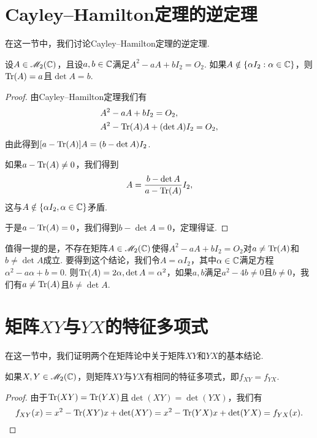 \section{Cayley--Hamilton定理的逆定理}

在这一节中，我们讨论Cayley--Hamilton定理的{\kaishu 逆定理}.
\begin{mybox}
  \begin{theorem}

    设$A\in\mathscr M_2(\mathbb C)$，且设$a,b\in\mathbb C$满足$A^2-aA+bI_2=O_2$. 如果$A\notin\{\alpha I_2:\alpha\in\mathbb C\}$，则$\operatorname{Tr}(A)=a$且$\det A=b$.
  \end{theorem}
\end{mybox}

\begin{proof}
  由Cayley--Hamilton定理我们有
  \begin{align*}
    & A^2 - aA + bI_2 = O_2, \\
    & A^2 - \operatorname{Tr}(A)A + (\det A)I_2 = O_2,
  \end{align*}
  由此得到$[a-\operatorname{Tr}(A)]A=(b-\det A)I_2$.

  如果$a-\operatorname{Tr}(A)\ne0$，我们得到
  \[
    A = \frac{b - \det A}{a - \operatorname{Tr}(A)}I_2,
  \]
  这与$A\notin\{\alpha I_2,\alpha\in\mathbb C\}$矛盾.

  于是$a-\operatorname{Tr}(A)=0$，我们得到$b-\det A = 0$，定理得证.
\end{proof}

\begin{remark}
  值得一提的是，不存在矩阵$A\in\mathscr M_2(\mathbb C)$使得$A^2-aA+bI_2=O_2$对$a\ne\operatorname{Tr}(A)$和$b\ne\det A$成立. 要得到这个结论，我们令$A=\alpha I_2$，其中$\alpha\in\mathbb C$满足方程$\alpha^2-a\alpha+b=0$. 则$\operatorname{Tr}(A)=2\alpha,\det A=\alpha^2$，如果$a,b$满足$a^2-4b\ne0$且$b\ne0$，我们有$a\ne\operatorname{Tr}(A)$且$b\ne\det A$.
\end{remark}

\section{矩阵$XY$与$YX$的特征多项式}

在这一节中，我们证明两个在矩阵论中关于矩阵$XY$和$YX$的基本结论.

\begin{theorem}[矩阵$XY$与$YX$的特征多项式.]

  如果$X,Y\in\mathscr M_2(\mathbb C)$，则矩阵$XY$与$YX$有相同的特征多项式，即$f_{XY}=f_{YX}$.
\end{theorem}

\begin{proof}
  由于$\operatorname{Tr}(XY)=\operatorname{Tr}(YX)$且$\det(XY)=\det(YX)$，我们有
  \[
    f_{XY}(x) = x^2 - \operatorname{Tr}(XY)x + \det(XY) = x^2 - \operatorname{Tr}(YX)x + \det(YX) = f_{YX}(x).
  \]
\end{proof}

